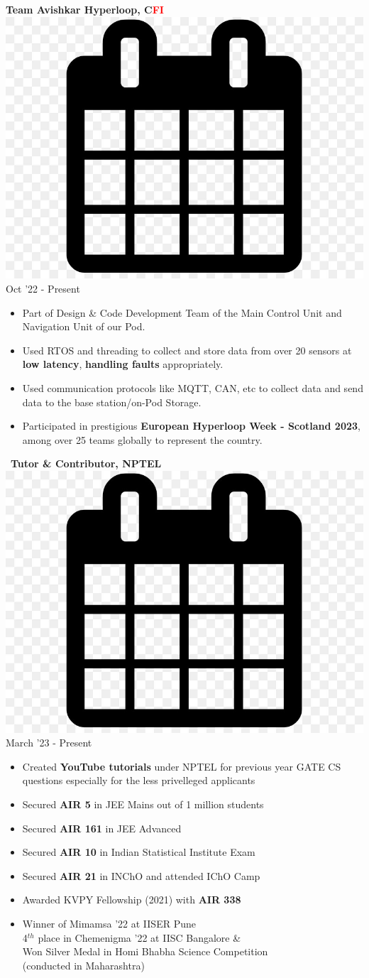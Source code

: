 \documentclass[10pt,article]{article}
\newcommand{\myMargin}{0.2in}
\newcommand{\resheading}[1]{{\small \colorbox{myblue} { \begin{minipage}{\dimexpr\linewidth-2\fboxsep}\centering{\textbf{#1 \vphantom{p\^{E}}}}\end{minipage}}}}
\newcommand{\myfont}[2]{\fontsize{#1}{#1}\selectfont #2}
\newcommand{\subheadingfont}[1]{\myfont{11pt}{#1}}
\newcommand{\projecttopic}[1]{\myfont{11pt}{\textbf{#1}}}
\newcommand{\mycal}[1]{\includegraphics[scale=0.02]{calendar.png} \myfont{10}{#1}}
\begin{document}
\begin{multicols*}{2}

\noindent
\projecttopic{Team Avishkar Hyperloop, C\textcolor{red}{FI}} \hfill \mycal{Oct '22 - Present} 
\begin{itemize}[noitemsep, nolistsep, leftmargin=\myMargin]
    \item Part of Design \& Code Development Team of the Main Control Unit and Navigation Unit of our Pod. 
    \item Used RTOS and threading to collect and store data from over 20 sensors at \textbf{low latency}, \textbf{handling faults} appropriately.
    \item Used communication protocols like MQTT, CAN, etc to collect data and send data to the base station/on-Pod Storage.
    \item Participated in prestigious \textbf{European Hyperloop Week - Scotland 2023}, 
    among over 25 teams globally to represent the country.
\end{itemize}
\noindent
\ 
\projecttopic{Tutor \& Contributor, \textcolor{nptel}{NPTEL}} \hfill \mycal{March '23 - Present} 
\begin{itemize}[noitemsep, nolistsep, leftmargin=\myMargin]
    \item Created \textbf{YouTube tutorials} under NPTEL for previous year GATE CS questions especially for the less privelleged applicants
\end{itemize}


  

\columnbreak



\noindent
\resheading{\subheadingfont{SCHOLASTIC ACHIEVEMENTS}}
\begin{itemize}[leftmargin=\myMargin]
\setlength \itemsep{-0.1em}
\item Secured \textbf{AIR 5} in JEE Mains out of 1 million students  %
\item Secured \textbf{AIR 161} in JEE Advanced \hfill
\item Secured \textbf{AIR 10} in Indian Statistical Institute Exam
\item Secured \textbf{AIR 21} in INChO and attended IChO Camp
\item Awarded KVPY Fellowship (2021) with \textbf{AIR 338}
\item Winner of Mimamsa '22 at IISER Pune \\ 4$^{th}$ place in Chemenigma '22 at IISC Bangalore \& \\ Won Silver Medal in Homi Bhabha Science Competition \\ (conducted in Maharashtra)
\end{itemize} 


\end{multicols*}
\end{document}
